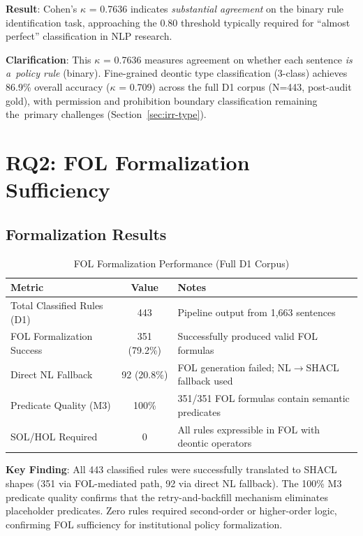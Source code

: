 \textbf{Result}: Cohen's $\kappa$ = 0.7636 indicates \textit{substantial agreement} on the binary rule identification task, approaching the 0.80 threshold typically required for ``almost perfect'' classification in NLP research.

\textbf{Clarification}: This $\kappa$ = 0.7636 measures agreement on whether each sentence \textit{is a~policy rule} (binary). Fine-grained deontic type classification (3-class) achieves 86.9\% overall accuracy ($\kappa$ = 0.709) across the full D1 corpus (N=443, post-audit gold), with permission and prohibition boundary classification remaining the~primary challenges (Section~\ref{sec:irr-type}).

\section{RQ2: FOL Formalization Sufficiency}

\subsection{Formalization Results}

\begin{table}[htbp]
\centering
\caption{FOL Formalization Performance (Full D1 Corpus)}
\label{tab:fol-results}
\begin{tabular}{|l|c|l|}
\hline
\textbf{Metric} & \textbf{Value} & \textbf{Notes} \\
\hline
Total Classified Rules (D1) & 443 & Pipeline output from 1,663 sentences \\
FOL Formalization Success & 351 (79.2\%) & Successfully produced valid FOL formulas \\
Direct NL Fallback & 92 (20.8\%) & FOL generation failed; NL$\rightarrow$SHACL fallback used \\
Predicate Quality (M3) & 100\% & 351/351 FOL formulas contain semantic predicates \\
SOL/HOL Required & 0 & All rules expressible in FOL with deontic operators \\
\hline
\end{tabular}
\end{table}

\textbf{Key Finding}: All 443 classified rules were successfully translated to SHACL shapes (351 via FOL-mediated path, 92 via direct NL fallback). The 100\% M3 predicate quality confirms that the retry-and-backfill mechanism eliminates placeholder predicates. Zero rules required second-order or higher-order logic, confirming FOL sufficiency for institutional policy formalization.

